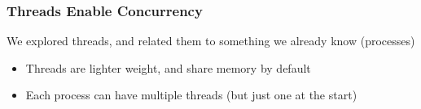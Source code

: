   \begin{frame}
    \frametitle{Threads Enable Concurrency}

    We explored threads, and related them to something we already know (processes)
    \begin{itemize}
      \item Threads are lighter weight, and share memory by default
      \item Each process can have multiple threads (but just one at the start)
    \end{itemize}
  \end{frame}

